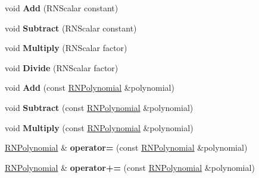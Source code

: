 \begin{DoxyCompactItemize}
\item 
void {\bfseries Add} (R\+N\+Scalar constant)\hypertarget{class_r_n_polynomial_a36a7d8aa1eb98b2b0307475936361549}{}\label{class_r_n_polynomial_a36a7d8aa1eb98b2b0307475936361549}

\item 
void {\bfseries Subtract} (R\+N\+Scalar constant)\hypertarget{class_r_n_polynomial_a89f042402f05ff89501ed1f76905fa28}{}\label{class_r_n_polynomial_a89f042402f05ff89501ed1f76905fa28}

\item 
void {\bfseries Multiply} (R\+N\+Scalar factor)\hypertarget{class_r_n_polynomial_a07bab8b889472d0e1676a5bbbcad5b89}{}\label{class_r_n_polynomial_a07bab8b889472d0e1676a5bbbcad5b89}

\item 
void {\bfseries Divide} (R\+N\+Scalar factor)\hypertarget{class_r_n_polynomial_abc3555755e158190b5c8f4bb5a3bb9e7}{}\label{class_r_n_polynomial_abc3555755e158190b5c8f4bb5a3bb9e7}

\item 
void {\bfseries Add} (const \hyperlink{class_r_n_polynomial}{R\+N\+Polynomial} \&polynomial)\hypertarget{class_r_n_polynomial_a5eb2faa9cb89f5ba5e71e8bcfd74d2df}{}\label{class_r_n_polynomial_a5eb2faa9cb89f5ba5e71e8bcfd74d2df}

\item 
void {\bfseries Subtract} (const \hyperlink{class_r_n_polynomial}{R\+N\+Polynomial} \&polynomial)\hypertarget{class_r_n_polynomial_a35d6874c8f2b2405cbeac8fe65910b25}{}\label{class_r_n_polynomial_a35d6874c8f2b2405cbeac8fe65910b25}

\item 
void {\bfseries Multiply} (const \hyperlink{class_r_n_polynomial}{R\+N\+Polynomial} \&polynomial)\hypertarget{class_r_n_polynomial_a1092bb08b53222a9f7a0988e0c748fb6}{}\label{class_r_n_polynomial_a1092bb08b53222a9f7a0988e0c748fb6}

\item 
\hyperlink{class_r_n_polynomial}{R\+N\+Polynomial} \& {\bfseries operator=} (const \hyperlink{class_r_n_polynomial}{R\+N\+Polynomial} \&polynomial)\hypertarget{class_r_n_polynomial_ad063ecb59d3c54e73f14de55520c0a40}{}\label{class_r_n_polynomial_ad063ecb59d3c54e73f14de55520c0a40}

\item 
\hyperlink{class_r_n_polynomial}{R\+N\+Polynomial} \& {\bfseries operator+=} (const \hyperlink{class_r_n_polynomial}{R\+N\+Polynomial} \&polynomial)\hypertarget{class_r_n_polynomial_a4fe4089a01944fbbf2167edee70e4a48}{}\label{class_r_n_polynomial_a4fe4089a01944fbbf2167edee70e4a48}


\end{DoxyCompactItemize}
